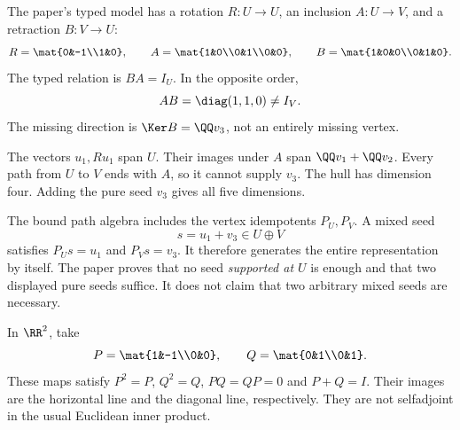 
The paper's typed model has a rotation $R:U\to U$, an inclusion $A:U\to V$, and a retraction $B:V\to U$:
\[
R=\mat{0&-1\\1&0},\qquad
A=\mat{1&0\\0&1\\0&0},\qquad
B=\mat{1&0&0\\0&1&0}.
\]
The typed relation is $BA=I_U$. In the opposite order,
\[
AB=\diag(1,1,0)\ne I_V.
\]
The missing direction is $\Ker B=\QQ v_3$, not an entirely missing vertex.


The vectors $u_1,Ru_1$ span $U$. Their images under $A$ span $\QQ v_1+\QQ v_2$. Every path from $U$ to $V$ ends with $A$, so it cannot supply $v_3$. The hull has dimension four. Adding the pure seed $v_3$ gives all five dimensions.

The bound path algebra includes the vertex idempotents $P_U,P_V$. A mixed seed
\[
s=u_1+v_3\in U\oplus V
\]
satisfies $P_Us=u_1$ and $P_Vs=v_3$. It therefore generates the entire representation by itself. The paper proves that no seed \emph{supported at $U$} is enough and that two displayed pure seeds suffice. It does not claim that two arbitrary mixed seeds are necessary.


In $\RR^2$, take
\[
P=\mat{1&-1\\0&0},\qquad Q=\mat{0&1\\0&1}.
\]
These maps satisfy $P^2=P$, $Q^2=Q$, $PQ=QP=0$ and $P+Q=I$. Their images are the horizontal line and the diagonal line, respectively. They are not selfadjoint in the usual Euclidean inner product.

